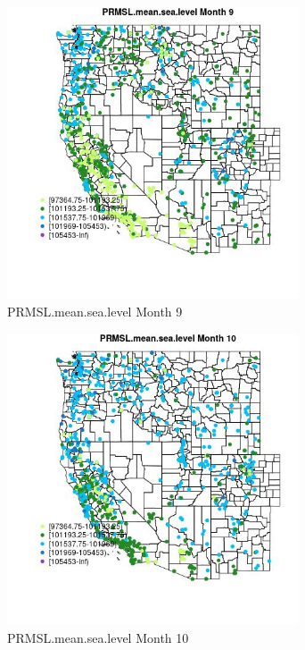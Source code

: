 \begin{figure} 
\centering  
\includegraphics[width=0.77\textwidth]{Code_Outputs/Report_ML_input_PM25_Step4_part_f_de_duplicated_aveswNAs_MapObsMo9PRMSLmeansealevel.jpg} 
\caption{\label{fig:Report_ML_input_PM25_Step4_part_f_de_duplicated_aveswNAsMapObsMo9PRMSLmeansealevel}PRMSL.mean.sea.level Month 9} 
\end{figure} 
 

\begin{figure} 
\centering  
\includegraphics[width=0.77\textwidth]{Code_Outputs/Report_ML_input_PM25_Step4_part_f_de_duplicated_aveswNAs_MapObsMo10PRMSLmeansealevel.jpg} 
\caption{\label{fig:Report_ML_input_PM25_Step4_part_f_de_duplicated_aveswNAsMapObsMo10PRMSLmeansealevel}PRMSL.mean.sea.level Month 10} 
\end{figure} 
 

